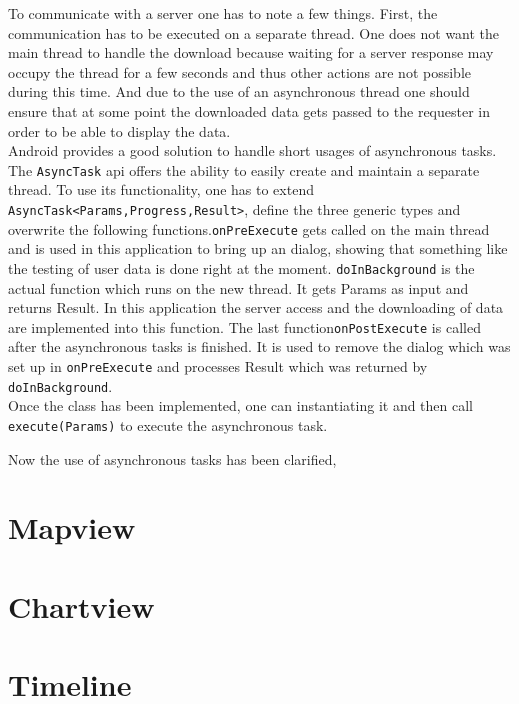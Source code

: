 To  communicate with a server one has to note a few things. First, the communication has to be executed on a separate thread. One does not want the main thread to handle the download because waiting for a server response may occupy the thread for a few seconds and thus other actions are not possible during this time. And due to the use of an asynchronous thread one should ensure that at some point the downloaded data gets passed to the requester in order to be able to display the data.\\
Android provides a good solution to handle short usages of asynchronous tasks. The \lstinline$AsyncTask$ api offers the ability to easily create and maintain a separate thread. To use its functionality, one has to extend \lstinline$AsyncTask<Params,Progress,Result>$, define the three generic types and overwrite the following functions.\lstinline$onPreExecute$ gets called on the main thread and is used in this application to bring up an dialog, showing that something like the testing of user data is done right at the moment.  \lstinline$doInBackground$ is the actual function which runs on the new thread. It gets Params as input and returns Result. In this application the server access and the downloading of data are implemented into this function. The last function\lstinline$onPostExecute$ is called after the asynchronous tasks is finished. It is used to remove the dialog which was set up in \lstinline$onPreExecute$ and processes Result which was returned by \lstinline$doInBackground$.\\
Once the class has been implemented, one can instantiating it and then call \lstinline$execute(Params)$ to execute the asynchronous task.

Now  the use of asynchronous tasks has been clarified, 

\newpage
\section{Mapview}

\newpage
\section{Chartview}

\newpage
\section{Timeline}


